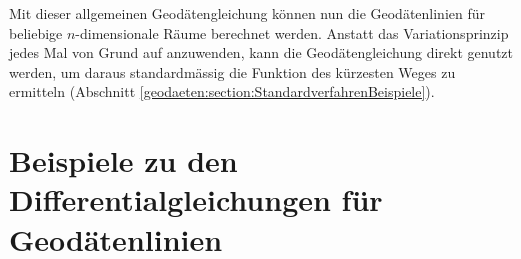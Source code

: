 Mit dieser allgemeinen Geodätengleichung können nun die Geodätenlinien für beliebige $n$-dimensionale Räume berechnet werden. 
Anstatt das Variationsprinzip jedes Mal von Grund auf anzuwenden, kann die Geodätengleichung direkt genutzt werden, um daraus standardmässig die Funktion des kürzesten Weges zu ermitteln (Abschnitt \ref{geodaeten:section:StandardverfahrenBeispiele}).

\section{Beispiele zu den Differentialgleichungen für Geodätenlinien 
\label{geodaeten:section:StandardverfahrenBeispiele}}




